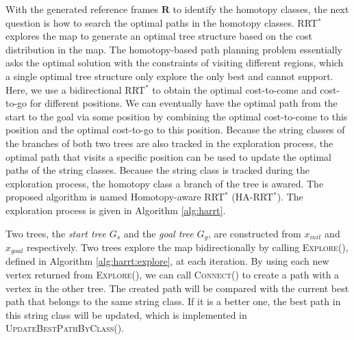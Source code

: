 \documentclass[letterpaper, 10 pt, conference]{ieeeconf}
\begin{document}

With the generated reference frames $ \mathbf{R} $ to identify the homotopy classes, the next question is how to search the optimal paths in the homotopy classes.
RRT$^{*}$ explores the map to generate an optimal tree structure based on the cost distribution in the map.
The homotopy-based path planning problem essentially asks the optimal solution with the constraints of visiting different regions, which a single optimal tree structure only explore the only best and cannot support.
Here, we use a bidirectional RRT$^{*}$ to obtain the optimal cost-to-come and cost-to-go for different positions.
We can eventually have the optimal path from the start to the goal via some position by combining the optimal cost-to-come to this position and the optimal cost-to-go to this position.
Because the string classes of the branches of both two trees are also tracked in the exploration process, the optimal path that visits a specific position can be used to update the optimal paths of the string classes. 
Because the string class is tracked during the exploration process, the homotopy class a branch of the tree is awared.
The proposed algorithm is named Homotopy-aware RRT$^{*}$ (HA-RRT$^{*}$).
The exploration process is given in Algorithm \ref{alg:harrt}.

Two trees, the \emph{start tree} $ G_{s} $ and the \emph{goal tree} $ G_{g} $, are constructed from $ x_{init} $ and $ x_{goal} $ respectively.
Two trees explore the map bidirectionally by calling \textsc{Explore}(), defined in Algorithm \ref{alg:harrt:explore}, at each iteration.
By using each new vertex returned from \textsc{Explore}(), we can call \textsc{Connect}() to create a path with a vertex in the other tree.
The created path will be compared with the current best path that belongs to the same string class.
If it is a better one, the best path in this string class will be updated, which is implemented in \textsc{UpdateBestPathByClass}().
\end{document}

